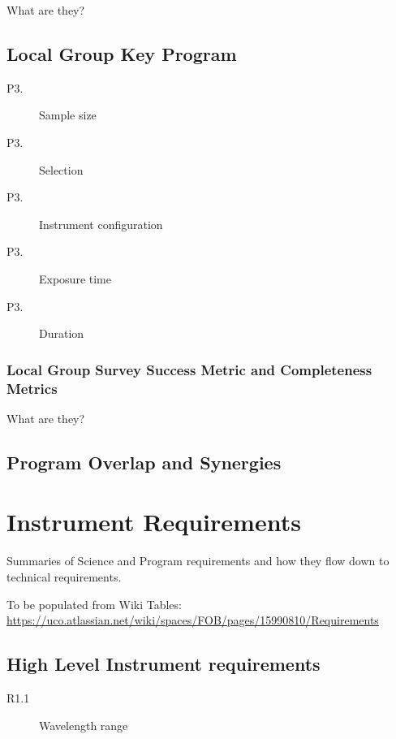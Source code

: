 \documentclass[preprint,11pt]{aastex}
\begin{document}
What are they?



\subsection{Local Group Key Program}

\begin{description}

\item[P3.] Sample size
\item[P3.] Selection 
\item[P3.] Instrument configuration 
\item[P3.] Exposure time
\item[P3.] Duration

\end{description}

\subsubsection{Local Group Survey Success Metric and Completeness Metrics}

What are they?

\subsection{Program Overlap and Synergies}



\section{Instrument Requirements}

Summaries of Science and Program requirements and how they flow down to technical requirements.

To be populated from Wiki Tables: \url{https://uco.atlassian.net/wiki/spaces/FOB/pages/15990810/Requirements}

\subsection{High Level Instrument requirements}

\begin{description}

\item [R1.1] Wavelength range



\end{description}
\end{document}
